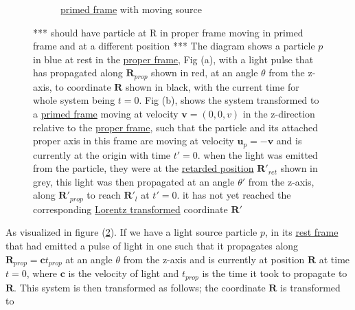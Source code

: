 \begin{figure}[ht]
\begin{subfigure}{.49\textwidth}
		\caption{\hyperlink{def-Primed-Frame}{primed frame} with moving source}
		\label{fig: primed frame 1}
	\end{subfigure}
	\caption{ *** should have particle at R in proper frame moving in primed frame and at a different position *** The diagram shows a particle $p$ in blue at rest in the \protect\hyperlink{def-proper-frame}{proper frame}, Fig (a), with a light pulse that has propagated along $\mathbf{R}_{prop}$ shown in red, at an angle $\theta$ from the z-axis, to coordinate $\mathbf{R}$ shown in black, with the current time for whole system being $t=0$.
	Fig (b), shows the system transformed to a \protect\hyperlink{def-Primed-Frame}{primed frame} moving at velocity $\mathbf{v}=(0,0,v)$ in the z-direction relative to the \protect\hyperlink{def-proper-frame}{proper frame}, such that the particle and its attached proper axis in this frame are moving at velocity $\mathbf{u}_p= - \mathbf{v}$ and is currently at the origin with time $t'=0$. when the light was emitted from the particle, they were at the \protect\hyperlink{def-retarded-position}{retarded position}  $\mathbf{R}'_{ret}$ shown in grey, this light was then propagated at an angle $\theta'$ from the z-axis, along $\mathbf{R}'_{prop}$ to reach $\mathbf{R}'_{l}$ at $t'=0$. it has not yet reached the corresponding \protect\hyperlink{def-lorentz-transform}{Lorentz transformed} coordinate $\mathbf{R}'$ }
	\label{fig: Retarded field outward field transform}
\end{figure}

As visualized in figure (\ref{fig: Retarded field outward field transform}). If we have a light source particle $p$, in its \hyperlink{def-proper-frame}{rest frame} that had emitted a pulse of light in one such that it propagates along $\mathbf{R}_{prop}=\mathbf{c}t_{prop}$ at an angle $\theta$ from the z-axis and is currently at position $\mathbf{R}$ at time $t=0$, where $\mathbf{c}$ is the velocity of light and $t_{prop}$ is the time it took to propagate to $\mathbf{R}$.
This system is then transformed as follows; the coordinate $\mathbf{R}$ is transformed to


